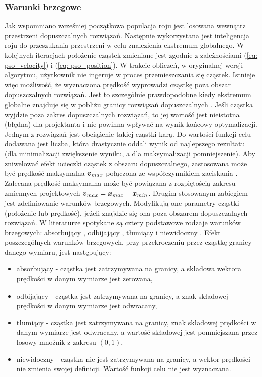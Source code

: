 %
\subsubsection{Warunki brzegowe}
Jak wspomniano wcześniej początkowa populacja roju jest losowana wewnątrz przestrzeni dopuszczalnych rozwiązań. Następnie wykorzystana jest inteligencja roju do przeszukania przestrzeni w celu znalezienia ekstremum globalnego. W kolejnych iteracjach położenie cząstek zmieniane jest zgodnie z zależnościami (\ref{eq: pso_velocity}) i (\ref{eq: pso_position}). W trakcie obliczeń, w oryginalnej wersji algorytmu, użytkownik nie ingeruje w proces przemieszczania się cząstek. Istnieje więc możliwość, że wyznaczona prędkość wyprowadzi cząstkę poza obszar dopuszczalnych rozwiązań. Jest to szczególnie prawdopodobne kiedy ekstremum globalne znajduje się w pobliżu granicy rozwiązań dopuszczalnych \parencite{Xu2007}. Jeśli cząstka wyjdzie poza zakres dopuszczalnych rozwiązań, to jej wartość jest nieistotna (błędna) dla projektanta i nie powinna wpływać na wynik końcowy optymalizacji. Jednym z rozwiązań jest obciążenie takiej cząstki karą. Do wartości funkcji celu dodawana jest liczba, która drastycznie oddali wynik od najlepszego rezultatu (dla minimalizacji zwiększenie wyniku, a dla maksymalizacji pomniejszenie). 
Aby zniwelować efekt ucieczki cząstek z obszaru dopuszczalnego, zastosowana może być prędkość maksymalna $\bm{v}_{max}$ połączona ze współczynnikiem zaciskania \parencite{Eberhart2001a}. Zalecana prędkość maksymalna może być powiązana z rozpiętością zakresu zmiennych projektowych $\bm{v}_{max}=\bm{x}_{max}-\bm{x}_{min}$. Drugim stosowanym zabiegiem jest zdefiniowanie warunków brzegowych. Modyfikują one parametry cząstki (położenie lub prędkość), jeżeli znajdzie się ona poza obszarem dopuszczalnych rozwiązań. W literaturze spotykane są cztery podstawowe rodzaje warunków brzegowych: absorbujący , odbijający , tłumiący  i niewidoczny  \parencite{Robinson2004,Huang2005}. Efekt poszczególnych warunków brzegowych, przy przekroczeniu przez cząstkę granicy danego wymiaru, jest następujący:
\begin{itemize}
	\item absorbujący - cząstka jest zatrzymywana na granicy, a składowa wektora prędkości w danym wymiarze jest zerowana,
	\item odbijający -  cząstka jest zatrzymywana na granicy, a znak składowej prędkości w danym wymiarze jest odwracany,
	\item tłumiący - cząstka jest zatrzymywana na granicy, znak składowej prędkości w danym wymiarze jest odwracany, a wartość składowej jest pomniejszana przez losowy mnożnik z zakresu $(0,1)$,
	\item niewidoczny - cząstka nie jest zatrzymywana na granicy, a wektor prędkości nie zmienia swojej definicji. Wartość funkcji celu nie jest wyznaczana.
\end{itemize} 

